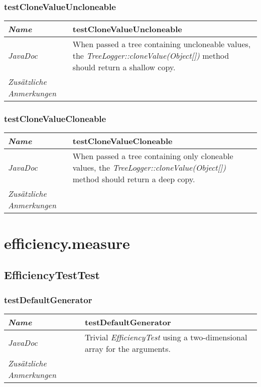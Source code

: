\documentclass[a4paper]{report}
\begin{document}
\subsubsection{testCloneValueUncloneable}
\begin{tabular}{p{2.3cm}  p{11.5cm}}
  \hline
 \textit{Name} & testCloneValueUncloneable\\
  \hline
 \textit{JavaDoc} & When passed a tree containing uncloneable values, the \emph{TreeLogger::cloneValue(Object[])} method should return a shallow copy.\\
  \hline
 \textit{Zusätzliche Anmerkungen} & \\
  \hline
\end{tabular}

\subsubsection{testCloneValueCloneable}
\begin{tabular}{p{2.3cm}  p{11.5cm}}
  \hline
 \textit{Name} & testCloneValueCloneable\\
  \hline
 \textit{JavaDoc} & When passed a tree containing only cloneable values, the \emph{TreeLogger::cloneValue(Object[])} method should return a deep copy.\\
  \hline
 \textit{Zusätzliche Anmerkungen} & \\
  \hline
\end{tabular}

\section{efficiency.measure}

\subsection{EfficiencyTestTest}

\subsubsection{testDefaultGenerator}
\begin{tabular}{p{2.3cm}  p{11.5cm}}
  \hline
 \textit{Name} & testDefaultGenerator\\
  \hline
 \textit{JavaDoc} & Trivial \emph{EfficiencyTest} using a two-dimensional array for the arguments.\\
  \hline
 \textit{Zusätzliche Anmerkungen} & \\
 \hline
\end{tabular}
\end{document}
